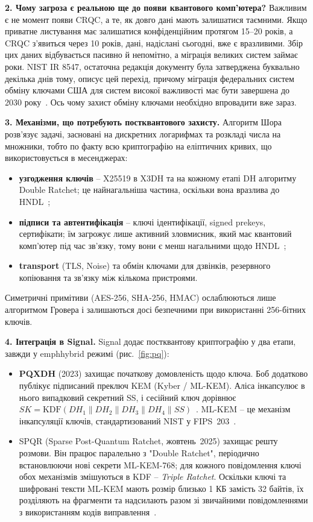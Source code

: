 \textbf{2. Чому загроза є реальною ще до появи квантового комп’ютера?} Важливим є не момент появи CRQC, а те, як 
довго дані мають залишатися таємними. Якщо приватне листування має залишатися конфіденційним протягом 15–20 років, 
а CRQC з’явиться через 10 років, дані, надіслані сьогодні, вже є вразливими. Збір цих даних відбувається пасивно 
й непомітно, а міграція великих систем займає роки. NIST IR 8547, остаточна редакція документу була затверджена 
буквально декілька днів тому, описує цей перехід, причому міграція федеральних систем обміну ключами США для 
систем високої важливості має бути завершена до 2030 року~\cite{nist_ir8547}. Ось чому захист обміну ключами 
необхідно впровадити вже зараз.

\textbf{3. Механізми, що потребують постквантового захисту.} Алгоритм Шора розв’язує задачі, засновані на дискретних 
логарифмах та розкладі числа на множники, тобто по факту всю криптографію на еліптичних кривих, що використовується 
в месенджерах:
\begin{itemize}[noitemsep]
    \item \textbf{узгодження ключів} -- X25519 в X3DH та на кожному етапі DH алгоритму Double Ratchet; це 
        найнагальніша частина, оскільки вона вразлива до HNDL~\cite{signal_pqxdh};
    \item \textbf{підписи та автентифікація} -- ключі ідентифікації, signed prekeys, сертифікати; їм загрожує 
        лише активний зловмисник, який має квантовий комп’ютер під час зв’язку, тому вони є менш нагальними 
        щодо HNDL~\cite{signal_pqxdh};
    \item \textbf{transport} (TLS, Noise) та обмін ключами для дзвінків, резервного копіювання та зв’язку між 
        кількома пристроями.
\end{itemize}
Симетричні примітиви (AES-256, SHA-256, HMAC) ослаблюються лише алгоритмом Гровера і залишаються досі безпечними 
при використанні 256-бітних ключів.

\textbf{4. Інтеграція в Signal.} Signal додає постквантову криптографію у два етапи, завжди у emph{hybrid режимі} 
(рис.~\ref{fig:pq}):
\begin{itemize}[noitemsep]
    \item \textbf{PQXDH} (2023) захищає початкову домовленість щодо ключа. Боб додатково публікує підписаний 
        преключ KEM (Kyber / ML-KEM). Аліса інкапсулює в нього випадковий секретний SS, і сесійний ключ дорівнює 
        $SK = \mathrm{KDF}(DH_1 \| DH_2 \| DH_3 \| DH_4 \| SS)$~\cite{signal_pqxdh}. ML-KEM -- це механізм інкапсуляції 
        ключів, стандартизований NIST у FIPS~203~\cite{nist_fips203}.
    \item SPQR (Sparse Post-Quantum Ratchet, жовтень~2025) захищає решту розмови. Він працює паралельно з 
        "Double Ratchet"{}, періодично встановлюючи нові секрети ML-KEM-768; для кожного повідомлення ключі обох 
        механізмів змішуються в KDF -- \emph{Triple Ratchet}. Оскільки ключі та шифровані тексти ML-KEM мають 
        розмір близько 1 КБ замість 32 байтів, їх розділяють на фрагменти та надсилають разом зі звичайними 
        повідомленнями з використанням кодів виправлення~\cite{signal_spqr}.
\end{itemize}

